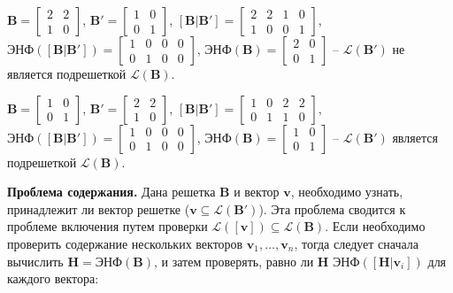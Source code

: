 $ \mathbf{B} = \left[\begin{array}{cccc}
2 & 2 \\
1 & 0
\end{array}\right] $, 
$ \mathbf{B}' = \left[\begin{array}{cccc}
1 & 0 \\
0 & 1
\end{array}\right] $, 
$ \left[\mathbf{B} | \mathbf{B}'\right] = \left[\begin{array}{cccc}
2 & 2 & 1 & 0 \\
1 & 0 & 0 & 1
\end{array}\right] $, 
$ \text{ЭНФ}(\left[\mathbf{B} | \mathbf{B}' \right]) = \left[\begin{array}{cccc}
1 & 0 & 0 & 0 \\
0 & 1 & 0 & 0
\end{array}\right] $,
$ \text{ЭНФ}(\mathbf{B}) = \left[\begin{array}{cccc}
2 & 0 \\
0 & 1
\end{array}\right] $ -- $ \mathcal{L}(\mathbf{B}') $ не является подрешеткой $ \mathcal{L}(\mathbf{B}) $.

$ \mathbf{B} = \left[\begin{array}{cccc}
1 & 0 \\
0 & 1
\end{array}\right] $, 
$ \mathbf{B}' = \left[\begin{array}{cccc}
2 & 2 \\
1 & 0
\end{array}\right] $, 
$ \left[\mathbf{B} | \mathbf{B}'\right] = \left[\begin{array}{cccc}
1 & 0 & 2 & 2 \\
0 & 1 & 1 & 0
\end{array}\right] $, 
$ \text{ЭНФ}(\left[\mathbf{B} | \mathbf{B}' \right]) = \left[\begin{array}{cccc}
1 & 0 & 0 & 0 \\
0 & 1 & 0 & 0
\end{array}\right] $,
$ \text{ЭНФ}(\mathbf{B}) = \left[\begin{array}{cccc}
1 & 0 \\
0 & 1
\end{array}\right] $ -- $ \mathcal{L}(\mathbf{B}') $ является подрешеткой $ \mathcal{L}(\mathbf{B}) $.

\textbf{Проблема содержания.} Дана решетка $ \mathbf{B} $ и вектор $ \mathbf{v} $, необходимо узнать, принадлежит ли вектор решетке ($ \mathbf{v} \subseteq \mathcal{L}(\mathbf{B}') $). Эта проблема сводится к проблеме включения путем проверки $ \mathcal{L}(\left[\mathbf{v}\right]) \subseteq \mathcal{L}(\mathbf{B}) $. Если необходимо проверить содержание нескольких векторов $ \mathbf{v}_1, \ldots, \mathbf{v}_n $, тогда следует сначала вычислить $ \mathbf{H} = \text{ЭНФ}(\mathbf{B}) $, и затем проверять, равно ли $ \mathbf{H} $ $ \text{ЭНФ}(\left[\mathbf{H} | \mathbf{v}_i \right]) $ для каждого вектора:

